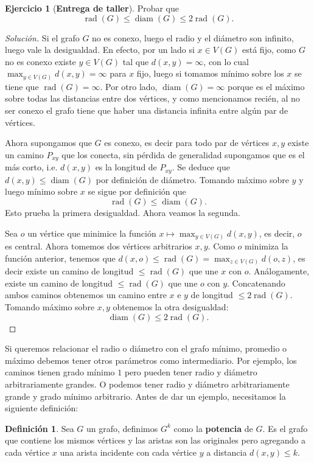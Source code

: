 \documentclass[12pt]{report}
\theoremstyle{plain}
\theoremstyle{definition}
\newtheorem{definition}[theorem]{Definición}
\newtheorem{exercise}[theorem]{Ejercicio}
\newenvironment{solution}{\begin{proof}[Solución]}{\end{proof}}
\newenvironment{Exercise}{\colorlet{shadecolor}{Lavender!12} \begin{shaded} \begin{exercise}}{ \end{exercise} \end{shaded}}
\newcommand{\diam}[1]{\operatorname{diam} (#1)}
\newcommand{\rad}[1]{\operatorname{rad}(#1)}
\begin{document}
\begin{Exercise}[\textbf{Entrega de taller}]
Probar que
$$
\rad G \leq \diam G \leq 2 \rad G .
$$
\end{Exercise}
\begin{solution}
Si el grafo $G$ no es conexo, luego el radio y el diámetro son infinito, luego vale la desigualdad. En efecto, por un lado si $x \in V(G)$ está fijo, como $G$ no es conexo existe $y \in V(G)$ tal que $d (x,y) = \infty$, con lo cual $\max_{y \in V(G)} d(x,y) = \infty$ para $x$ fijo, luego si tomamos mínimo sobre los $x$ se tiene que $\rad G = \infty$. Por otro lado, $\diam G = \infty$ porque es el máximo sobre todas las distancias entre dos vértices, y como mencionamos recién, al no ser conexo el grafo tiene que haber una distancia infinita entre algún par de vértices.

Ahora supongamos que $G$ es conexo, es decir para todo par de vértices $x,y$ existe un camino $P_{xy}$ que los conecta, sin pérdida de generalidad supongamos que es el más corto, i.e. $d(x,y)$ es la longitud de $P_{xy}$. Se deduce que $d(x,y) \leq \diam G$ por definición de diámetro. Tomando máximo sobre $y$ y luego mínimo sobre $x$ se sigue por definición que
$$
\rad G \leq \diam G.
$$
Esto prueba la primera desigualdad. Ahora veamos la segunda.

Sea $o$ un vértice que minimice la función $x \mapsto \max_{y \in V(G)} d(x,y)$, es decir, $o$ es central. Ahora tomemos dos vértices arbitrarios $x,y$. Como $o$  minimiza la función anterior, tenemos que $d(x,o) \leq \rad G = \max_{z \in V(G)} d(o,z)$, es decir existe un camino de longitud $\leq \rad G$ que une $x$ con $o$. Análogamente, existe un camino de longitud $\leq \rad G$ que une $o$ con $y$. Concatenando ambos caminos obtenemos un camino entre $x$ e $y$ de longitud $\leq 2 \rad G$. Tomando máximo sobre $x,y$ obtenemos la otra desigualdad:
$$
\diam G \leq 2 \rad G.
$$
\end{solution}

Si queremos relacionar el radio o diámetro con el grafo mínimo, promedio o máximo debemos tener otros parámetros como intermediario. Por ejemplo, los caminos tienen grado mínimo $1$ pero pueden tener radio y diámetro arbitrariamente grandes. O podemos tener radio y diámetro arbitrariamente grande y grado mínimo arbitrario. Antes de dar un ejemplo, necesitamos la siguiente definición:

\begin{definition}
Sea $G$ un grafo, definimos $G^k$ como la \textbf{potencia} de $G$. Es el grafo que contiene los mismos vértices y
las aristas son las originales pero agregando a cada vértice $x$ una arista incidente con cada vértice $y$ a
distancia $ d(x,y) \leq k$.
\end{definition}
\end{document}
